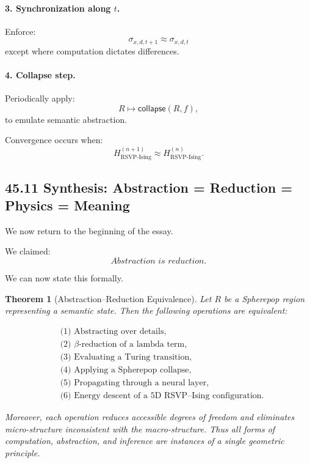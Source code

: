 \documentclass[12pt,letterpaper]{article}
\newtheorem{theorem}{Theorem}[section]
\theoremstyle{remark}
\begin{document}
\paragraph{3. Synchronization along $t$.}
Enforce:
\[
\sigma_{x,d,t+1} \approx \sigma_{x,d,t}
\]
except where computation dictates differences.

\paragraph{4. Collapse step.}
Periodically apply:
\[
R \mapsto \mathsf{collapse}(R,f),
\]
to emulate semantic abstraction.

Convergence occurs when:
\[
H_{\text{RSVP-Ising}}^{(n+1)} \approx H_{\text{RSVP-Ising}}^{(n)}.
\]

\subsection{45.11 Synthesis: Abstraction = Reduction = Physics = Meaning}

We now return to the beginning of the essay.

We claimed:
\[
\textit{Abstraction is reduction.}
\]

We can now state this formally.

\begin{theorem}[Abstraction--Reduction Equivalence]
Let $R$ be a Spherepop region representing a semantic state.
Then the following operations are equivalent:

\[
\begin{aligned}
&\text{(1) Abstracting over details},\\
&\text{(2) $\beta$-reduction of a lambda term},\\
&\text{(3) Evaluating a Turing transition},\\
&\text{(4) Applying a Spherepop collapse},\\
&\text{(5) Propagating through a neural layer},\\
&\text{(6) Energy descent of a 5D RSVP--Ising configuration}.
\end{aligned}
\]

Moreover, each operation reduces accessible degrees of freedom 
and eliminates micro-structure inconsistent with the macro-structure.
Thus all forms of computation, abstraction, and inference
are instances of a single geometric principle.
\end{theorem}
\end{document}
